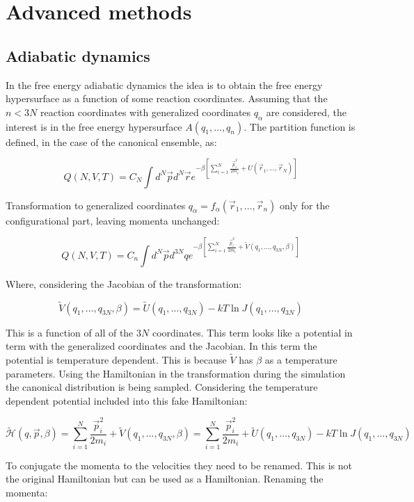 \graphicspath{{chapters/20/images/}}
\chapter{Advanced methods}

\section{Adiabatic dynamics}
In the free energy adiabatic dynamics the idea is to obtain the free energy hypersurface as a function of some reaction coordinates.
Assuming that the $n<3N$ reaction coordinates with generalized coordinates $q_\alpha$ are considered, the interest is in the free energy hypersurface $A(q_1, \dots, q_n)$.
The partition function is defined, in the case of the canonical ensemble, as:

$$Q(N, V, T) = C_N\int d^N\vec{p}d^N\vec{r}e^{-\beta\left[\sum\limits_{i=1}^N\frac{\vec{p}_i^2}{2m_i}+U(\vec{r}_1, \dots, \vec{r}_N)\right]}$$

Transformation to generalized coordinates $q_\alpha = f_\alpha(\vec{r}_1, \dots, \vec{r}_n)$ only for the configurational part, leaving momenta unchanged:

$$Q(N, V, T) = C_n\int d^N\vec{p}d^{3N}qe^{-\beta\left[\sum\limits_{i=1}^N\frac{\vec{p}_i^2}{2m_i} + \tilde{V}(q_1, \dots, q_{3N}, \beta)\right]}$$

Where, considering the Jacobian of the transformation:

$$\tilde{V}(q_1, \dots, q_{3N}, \beta) = \tilde{U}(q_1, \dots, q_{3N}) - kT\ln J(q_1, \dots, q_{3N})$$

This is a function of all of the $3N$ coordinates.
This term looks like a potential in term with the generalized coordinates and the Jacobian.
In this term the potential is temperature dependent.
This is because $\tilde{V}$ has $\beta$ as a temperature parameters.
Using the Hamiltonian in the transformation during the simulation the canonical distribution is being sampled.
Considering the temperature dependent potential included into this fake Hamiltonian:

$$\tilde{\mathcal{H}}(q, \vec{p}, \beta) = \sum\limits_{i=1}^N\frac{\vec{p}_i^2}{2m_i}+\tilde{V}(q_1, \dots, q_{3N}, \beta) = \sum\limits_{i=1}^N\frac{\vec{p}_i^2}{2m_i}+\tilde{U}(q_1, \dots, q_{3N})-kT\ln J(q_1, \dots, q_{3N})$$

To conjugate the momenta to the velocities they need to be renamed.
This is not the original Hamiltonian but can be used as a Hamiltonian.
Renaming the momenta:

